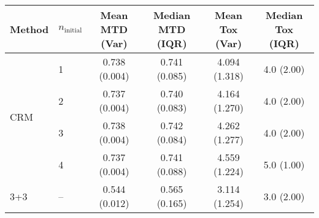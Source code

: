 \begin{tabular}{llcccc}
\toprule
Method & $n_{\text{initial}}$ & Mean MTD (Var)  & Median MTD (IQR)  & Mean Tox (Var)  & Median Tox (IQR)  \\
\midrule
\multirow{4}{*}{CRM} & 1 & 0.738 (0.004) & 0.741 (0.085) & 4.094 (1.318) & 4.0 (2.00) \\
 & 2 & 0.737 (0.004) & 0.740 (0.083) & 4.164 (1.270) & 4.0 (2.00) \\
 & 3 & 0.738 (0.004) & 0.742 (0.084) & 4.262 (1.277) & 4.0 (2.00) \\
 & 4 & 0.737 (0.004) & 0.741 (0.088) & 4.559 (1.224) & 5.0 (1.00) \\
\midrule
3+3 & -- & 0.544 (0.012) & 0.565 (0.165) & 3.114 (1.254) & 3.0 (2.00) \\
\bottomrule
\end{tabular}
